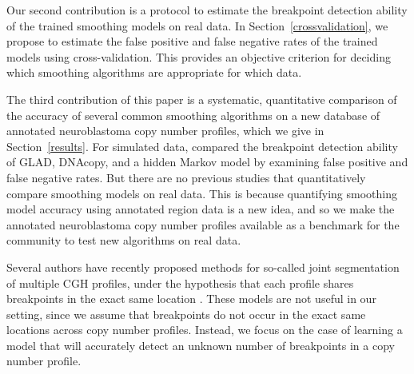 \documentclass{bioinfo}
\begin{document}
Our second contribution is a protocol to estimate the breakpoint
detection ability of the trained smoothing models on real data. In
Section~\ref{crossvalidation}, we propose to estimate the false
positive and false negative rates of the trained models using
cross-validation. This provides an objective criterion for deciding
which smoothing algorithms are appropriate for which data.

The third contribution of this paper is a systematic, quantitative
comparison of the accuracy of several common smoothing algorithms on a
new database of annotated neuroblastoma copy number profiles, which we
give in Section~\ref{results}. For simulated data, \cite{compare}
compared the breakpoint detection ability of GLAD, DNAcopy, and a
hidden Markov model by examining false positive and false negative
rates. But there are no previous studies that quantitatively compare
smoothing models on real data. This is because quantifying smoothing
model accuracy using annotated region data is a new idea, and so we
make the annotated neuroblastoma copy number profiles available as a
benchmark for the community to test new algorithms on real data.

Several authors have recently proposed methods for so-called joint
segmentation of multiple CGH profiles, under the hypothesis that each
profile shares breakpoints in the exact same location
\citep{jp-nips,guillem-joint,nbc}. These models are not useful in our
setting, since we assume that breakpoints do not occur in the exact
same locations across copy number profiles. Instead, we focus on the
case of learning a model that will accurately detect an unknown number
of breakpoints in a copy number profile.
\end{document}
